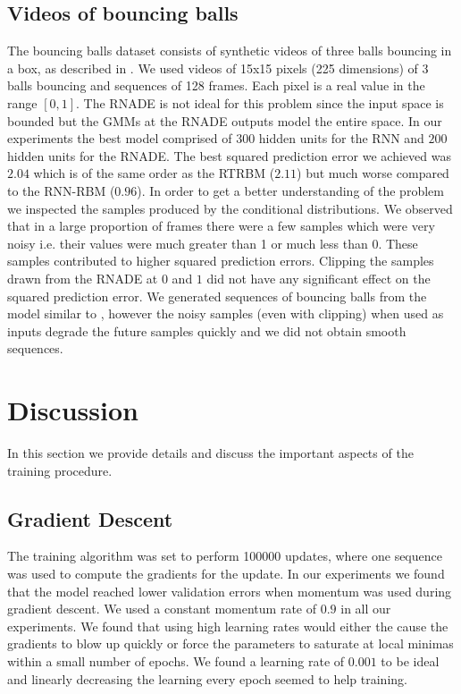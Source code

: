 \documentclass{article} %
\begin{document}
\subsection{Videos of bouncing balls}
The bouncing balls dataset consists of synthetic videos of three balls bouncing in a box, as described in \cite{Sutskever2008}. We used videos of 15x15 pixels (225 dimensions) of 3 balls bouncing and sequences of 128 frames. Each pixel is a real value in the range $[0,1]$. The RNADE is not ideal for this problem since the input space is bounded but the GMMs at the RNADE outputs model the entire space. In our experiments the best model comprised of $300$ hidden units for the RNN and $200$ hidden units for the RNADE. The best squared prediction error we achieved was $2.04$ which is of the same order as the RTRBM ($2.11$) but much worse compared to the RNN-RBM ($0.96$). In order to get a better understanding of the problem we inspected the samples produced by the conditional distributions. We observed that in a large proportion of frames there were a few samples which were very noisy i.e. their values were much greater than 1 or much less than 0. These samples contributed to higher squared prediction errors. Clipping the samples drawn from the RNADE at $0$ and $1$ did not have any significant effect on the squared prediction error. We generated sequences of bouncing balls from the model similar to \cite{Sutskever2008}, however the noisy samples (even with clipping) when used as inputs degrade the future samples quickly and we did not obtain smooth sequences. 

\section{Discussion}
\label{Discussion}
In this section we provide details and discuss the important aspects of the training procedure.
\subsection{Gradient Descent}
 The training algorithm was set to perform 100000 updates, where one sequence was used to compute the gradients for the update. In our experiments we found that the model reached lower validation errors when momentum was used during gradient descent. We used a constant momentum rate of $0.9$ in all our experiments. We found that using high learning rates would either the cause the gradients to blow up quickly or force the parameters to saturate at local minimas within a small number of epochs. We found a learning rate of $0.001$ to be ideal and linearly decreasing the learning every epoch seemed to help training. 
\end{document}
